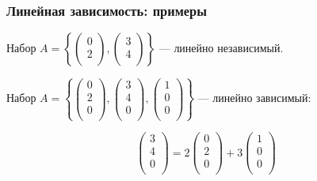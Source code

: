 \begin{frame}
\frametitle{Линейная зависимость: примеры}



Набор $A = \left\{ \begin{pmatrix}
      0 \\
      2 \\
    \end{pmatrix}, \begin{pmatrix}
      3 \\
      4 \\
    \end{pmatrix} \right\}$ — линейно независимый.

\pause

Набор $A = \left\{ \begin{pmatrix}
      0 \\
      2 \\
      0 \\
    \end{pmatrix}, \begin{pmatrix}
      3 \\
      4 \\
      0 \\
    \end{pmatrix},
    \begin{pmatrix}
      1 \\
      0 \\
      0 \\
    \end{pmatrix} \right\}$ — линейно зависимый:

    \[
      \begin{pmatrix}
        3 \\
        4 \\
        0 \\
      \end{pmatrix} = 2
    \begin{pmatrix}
      0 \\
      2 \\
      0 \\
    \end{pmatrix} + 3
    \begin{pmatrix}
      1 \\
      0 \\
      0 \\
    \end{pmatrix}  
    \]
  

\end{frame}


